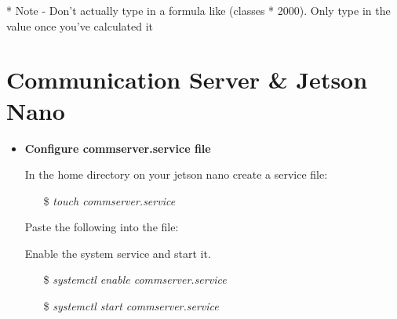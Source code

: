 \begin{itemize}
* Note - Don't actually type in a formula like (classes * 2000). Only type in the value once you've calculated it

\end{itemize}

\section{Communication Server \& Jetson Nano}

\begin{itemize}
\item \textbf{Configure commserver.service file}

In the home directory on your jetson nano create a service file:

\begin{itemize}
    \item[\$] \textit{touch commserver.service}
\end{itemize}

Paste the following into the file: 


Enable the system service and start it.

\begin{itemize}
    \item[\$] \textit{systemctl enable commserver.service}
    \item[\$] \textit{systemctl start commserver.service}
\end{itemize}

\end{itemize}
